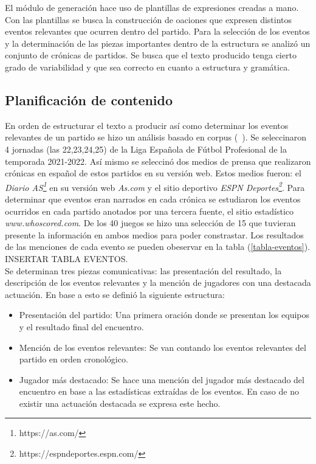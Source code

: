     El módulo de generación hace uso de plantillas de expresiones creadas a mano. Con las plantillas se busca la 
construcción de oaciones que expresen distintos eventos relevantes que ocurren dentro del partido. Para la selección de 
los eventos y la determinación de las piezas importantes dentro de la estructura se analizó un conjunto de crónicas de partidos. 
Se busca que el texto producido tenga cierto grado de variabilidad y que sea correcto en cuanto a estructura y gramática.


\subsection{Planificación de contenido}

    En orden de estructurar el texto a producir así como determinar los eventos relevantes de un partido se hizo un análisis basado en 
corpus (~\cite{reiter_dale_2000}). Se seleccinaron 4 jornadas (las 22,23,24,25) de la Liga Española de Fútbol Profesional de la temporada 
2021-2022. Así mismo se seleccinó dos medios de prensa que realizaron crónicas en español de estos partidos en su versión web. Estos medios 
fueron: el \textit{Diario AS\footnote[1]{https://as.com/}} en su versión web \textit{As.com} y el sitio deportivo 
\textit{ESPN Deportes\footnote[2]{https://espndeportes.espn.com/}}. Para determinar que eventos eran narrados en cada crónica se 
estudiaron los eventos ocurridos en cada partido anotados por una tercera fuente, el sitio estadístico \textit{www.whoscored.com}. 
De los 40 juegos se hizo una selección de 15 que tuvieran presente la información en ambos medios para poder constrastar. Los resultados de las 
menciones de cada evento se pueden obeservar en la tabla (\ref{tabla-eventos}).\\



            INSERTAR TABLA EVENTOS.\\

    Se determinan tres piezas comunicativas: las presentación del resultado, la descripción de los eventos relevantes y 
la mención de jugadores con una destacada actuación. En base a esto se definió la siguiente estructura:

\begin{itemize}
    \item Presentación del partido: Una primera oración donde se presentan los equipos y el resultado final del encuentro.
    \item Mención de los eventos relevantes: Se van contando los eventos relevantes del partido en orden cronol\'ogico.
    \item Jugador más destacado: Se hace una mención del jugador más destacado del encuentro en base a las estadísticas extraídas de los 
    eventos. En caso de no existir una actuación destacada se expresa este hecho.
\end{itemize}


